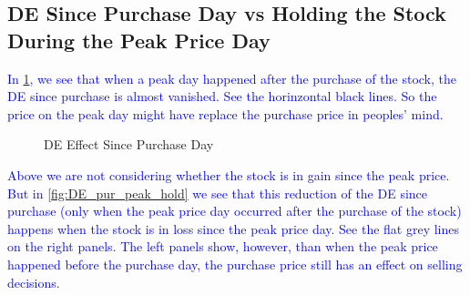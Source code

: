 \clearpage
\subsection{DE Since Purchase Day vs Holding the Stock During the Peak Price Day}

\textcolor{blue}{In \ref{fig:DE_purch_holding}, we see that when a peak day happened after the purchase of the stock, the DE since purchase is almost vanished. See the horinzontal black lines. So the price on the peak day might have replace the purchase price in peoples' mind.}


 

 
\begin{figure}[h]%
	\centering%
	\caption{DE Effect Since Purchase Day}%
	\label{fig:DE_purch_holding}%
	\fignote{  }
\end{figure}

\textcolor{blue}{Above we are not considering whether the stock is in gain since the peak price. But in \ref{fig:DE_pur_peak_hold} we see that this reduction of the DE since purchase (only when the peak price day occurred after the purchase of the stock) happens when the stock is in loss since the peak price day. See the flat grey lines on the right panels. The left panels show, however, than when the peak price happened before the purchase day, the purchase price still has an effect on selling decisions.}

